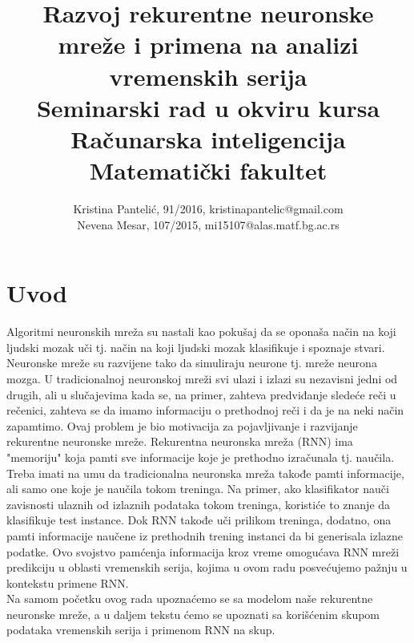 \documentclass[a4paper]{article}
\begin{document}
\title{Razvoj rekurentne neuronske mreže i primena na analizi vremenskih serija\\  \small{Seminarski rad u okviru kursa\\Računarska inteligencija\\ Matematički fakultet}}

\author{Kristina Pantelić, 91/2016, kristinapantelic@gmail.com \\Nevena Mesar, 107/2015, mi15107@alas.matf.bg.ac.rs }


\maketitle


\tableofcontents

\newpage

\section{Uvod}
\label{sec:uvod}

Algoritmi neuronskih mreža su nastali kao pokušaj da se oponaša način na koji ljudski
mozak uči tj. način na koji ljudski mozak klasifikuje i spoznaje stvari. Neuronske mreže su razvijene tako da simuliraju neurone tj. mreže neurona mozga\cite{master_rad}. U tradicionalnoj neuronskoj mreži svi ulazi i izlazi su nezavisni jedni od drugih, ali u slučajevima kada se, na primer, zahteva predviđanje sledeće reči u rečenici, zahteva se da imamo informaciju o prethodnoj reči i da je na neki način zapamtimo\cite{introRNN}. Ovaj problem je bio motivacija za pojavljivanje i razvijanje rekurentne neuronske mreže. Rekurentna neuronska mreža (RNN) ima "memoriju"{} koja pamti sve informacije koje je prethodno izračunala tj. naučila. Treba imati na umu da tradicionalna neuronska mreža takođe pamti informacije, ali samo one koje je naučila tokom treninga. Na primer, ako klasifikator nauči zavisnosti ulaznih od izlaznih podataka tokom treninga, koristiće to znanje da klasifikuje test instance. Dok RNN takođe uči prilikom treninga, dodatno, ona pamti informacije naučene iz prethodnih trening instanci da bi generisala izlazne podatke\cite{introRNN2}. Ovo svojstvo pamćenja informacija kroz vreme omogućava RNN mreži predikciju u oblasti vremenskih serija\cite{introRNN}, kojima u ovom radu posvećujemo pažnju u kontekstu primene RNN. \\
\indent Na samom početku ovog rada upoznaćemo se sa modelom naše rekurentne neuronske mreže, a u daljem tekstu ćemo se upoznati sa korišćenim skupom podataka vremenskih serija i primenom RNN na skup.  
\end{document}
